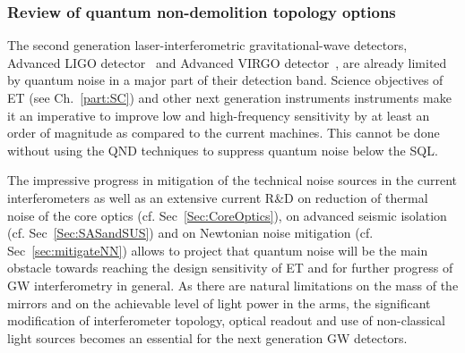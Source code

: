 
\subsubsection{Review of quantum non-demolition topology options}
\label{subsec:qndopt}

The second generation laser-interferometric gravitational-wave detectors, Advanced LIGO detector~\cite{TheLIGOScientific:2014jea} and Advanced VIRGO detector~\cite{TheVirgo:2014hva}, are already limited by quantum noise in a major part of their detection band. Science objectives of ET (see Ch.~\ref{part:SC}) and other next generation instruments instruments make it an imperative to improve low and high-frequency sensitivity by at least an order of magnitude as compared to the current machines. This cannot be done without using the QND techniques to suppress quantum noise below the SQL.

The impressive progress in mitigation of the technical noise sources in the current interferometers as well as an extensive current R\&D on reduction of thermal noise of the core optics (cf. Sec~\ref{Sec:CoreOptics}), on advanced seismic isolation (cf. Sec~\ref{Sec:SASandSUS}) and on Newtonian noise mitigation (cf. Sec~\ref{sec:mitigateNN}) allows to project that quantum noise will be the main obstacle towards reaching the design sensitivity of ET and  for further progress of GW interferometry in general. As there are natural limitations on the mass of the mirrors and on the achievable level of light power in the arms, the significant modification of interferometer topology, optical readout and use of non-classical light sources becomes an essential for the next generation GW detectors.

